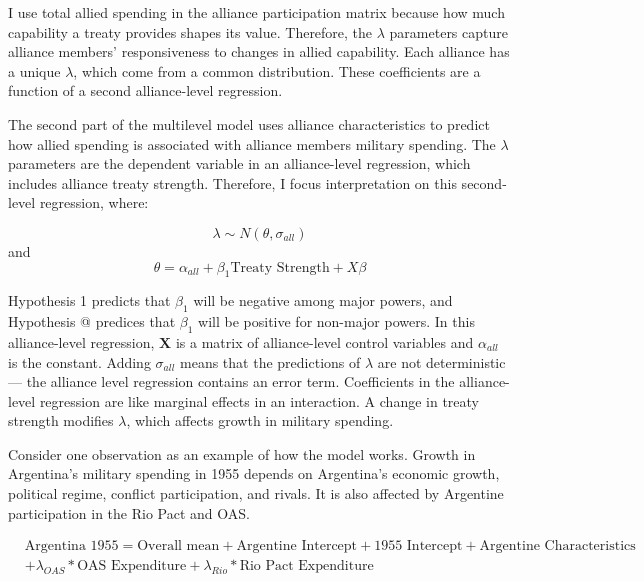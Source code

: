 \documentclass[12pt]{article}
\begin{document}
I use total allied spending in the alliance participation matrix because how much capability a treaty provides shapes its value.   
Therefore, the $\lambda$ parameters capture alliance members' responsiveness to changes in allied capability. 
Each alliance has a unique $\lambda$, which come from a common distribution. 
These coefficients are a function of a second alliance-level regression. 

The second part of the multilevel model uses alliance characteristics to predict how allied spending is associated with alliance members military spending. 
The $\lambda$ parameters are the dependent variable in an alliance-level regression, which includes alliance treaty strength.
Therefore, I focus interpretation on this second-level regression, where: 

\begin{equation}
\lambda \sim N(\theta, \sigma_{all})
\end{equation} 
and 
\begin{equation}
\theta = \alpha_{all} + \beta_1 \mbox{Treaty Strength} + X \beta
\end{equation}

Hypothesis 1 predicts that $\beta_1$ will be negative among major powers, and Hypothesis @ predices that $\beta_1$ will be positive for non-major powers. 
In this alliance-level regression, $\textbf{X}$ is a matrix of alliance-level control variables and $\alpha_{all}$ is the constant.
Adding $\sigma_{all}$ means that the predictions of $\lambda$ are not deterministic--- the alliance level regression contains an error term. 
Coefficients in the alliance-level regression are like marginal effects in an interaction. 
A change in treaty strength modifies $\lambda$, which affects growth in military spending. 


Consider one observation as an example of how the model works. 
Growth in Argentina's military spending in 1955 depends on Argentina's economic growth, political regime, conflict participation, and rivals. 
It is also affected by Argentine participation in the Rio Pact and OAS. 


\begin{equation}
\begin{split}
& \mbox{Argentina 1955} = \mbox{Overall mean}
+ \mbox{Argentine Intercept} + \mbox{1955 Intercept} 
+ \mbox{Argentine Characteristics} \\
& + \lambda_{OAS} * \mbox{OAS Expenditure} + \lambda_{Rio} * \mbox{Rio Pact Expenditure}
\end{split} 
\end{equation}
\end{document}
